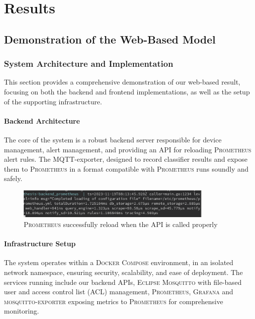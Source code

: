 \chapter{Results}

\section{Demonstration of the Web-Based Model}


\subsection{System Architecture and Implementation}
This section provides a comprehensive demonstration of our web-based result, focusing on both the backend and frontend implementations, as well as the setup of the supporting infrastructure.

\subsubsection{Backend Architecture}
The core of the system is a robust backend server responsible for device management, alert management, and providing an API for reloading \textsc{Prometheus} alert rules. The MQTT-exporter, designed to record classifier results and expose them to \textsc{Prometheus} in a format compatible with \textsc{Prometheus} runs soundly and safely.

\begin{figure}[htbp]
  \centering
  \includegraphics[width=0.85\textwidth]{Pictures/prometheusreload}
  \caption{\label{fig:prometheusreload}\textsc{Prometheus} successfully reload when the API is called properly}
\end{figure}

\subsubsection{Infrastructure Setup}
The system operates within a \textsc{Docker Compose} environment, in an isolated network namespace, ensuring security, scalability, and ease of deployment. The services running include our backend APIs, \textsc{Eclipse Mosquitto} with file-based user and access control list (ACL) management, \textsc{Prometheus}, \textsc{Grafana} and \textsc{mosquitto-exporter} exposing metrics to \textsc{Prometheus} for comprehensive monitoring.

